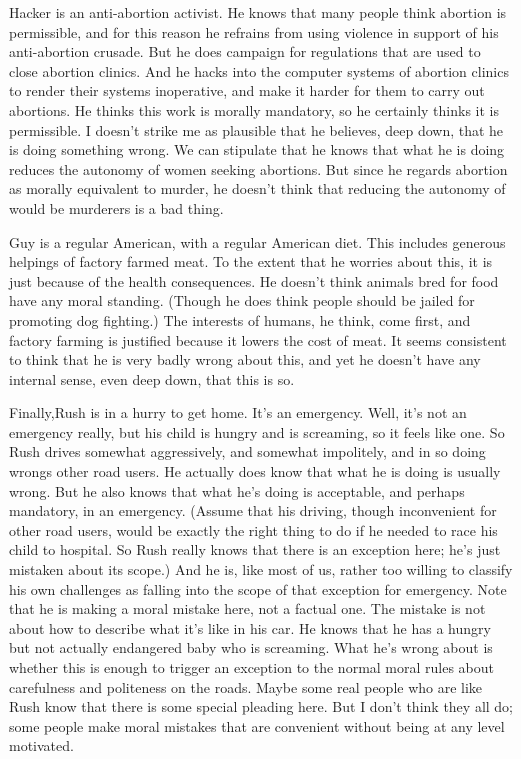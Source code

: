 \documentclass[
  10pt,
  letterpaper,
  twoside]{scrbook}
\begin{document}
{Hacker} is an anti-abortion activist. He knows that many people think
abortion is permissible, and for this reason he refrains from using
violence in support of his anti-abortion crusade. But he does campaign
for regulations that are used to close abortion clinics. And he hacks
into the computer systems of abortion clinics to render their systems
inoperative, and make it harder for them to carry out abortions. He
thinks this work is morally mandatory, so he certainly thinks it is
permissible. I doesn't strike me as plausible that he believes, deep
down, that he is doing something wrong. We can stipulate that he knows
that what he is doing reduces the autonomy of women seeking abortions.
But since he regards abortion as morally equivalent to murder, he
doesn't think that reducing the autonomy of would be murderers is a bad
thing.

{Guy} is a regular American, with a regular American diet. This includes
generous helpings of factory farmed meat. To the extent that he worries
about this, it is just because of the health consequences. He doesn't
think animals bred for food have any moral standing. (Though he does
think people should be jailed for promoting dog fighting.) The interests
of humans, he think, come first, and factory farming is justified
because it lowers the cost of meat. It seems consistent to think that he
is very badly wrong about this, and yet he doesn't have any internal
sense, even deep down, that this is so.

Finally,{Rush} is in a hurry to get home. It's an emergency. Well, it's
not an emergency really, but his child is hungry and is screaming, so it
feels like one. So {Rush} drives somewhat aggressively, and somewhat
impolitely, and in so doing wrongs other road users. He actually does
know that what he is doing is usually wrong. But he also knows that what
he's doing is acceptable, and perhaps mandatory, in an emergency.
(Assume that his driving, though inconvenient for other road users,
would be exactly the right thing to do if he needed to race his child to
hospital. So Rush really knows that there is an exception here; he's
just mistaken about its scope.) And he is, like most of us, rather too
willing to classify his own challenges as falling into the scope of that
exception for emergency. Note that he is making a moral mistake here,
not a factual one. The mistake is not about how to describe what it's
like in his car. He knows that he has a hungry but not actually
endangered baby who is screaming. What he's wrong about is whether this
is enough to trigger an exception to the normal moral rules about
carefulness and politeness on the roads. Maybe some real people who are
like {Rush} know that there is some special pleading here. But I don't
think they all do; some people make moral mistakes that are convenient
without being at any level motivated.
\end{document}
